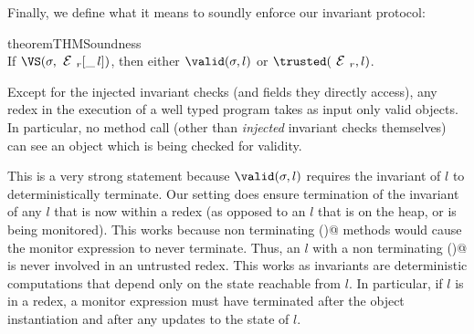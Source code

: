 Finally, we define what it means to soundly enforce our invariant protocol:

\SS\begin{restatable}[Soundness]{theorem}{THMSoundness}\ \\ %
\indent If $\VS(\s, \ER[\_\,l])$, then either $\valid(\s,l)$ or $\trusted(\ER,l)$.
\end{restatable}\SS\noindent
Except for the injected invariant checks (and fields they directly access),
any redex in the execution of a well typed program takes as input only valid objects.
In particular, no method call (other than \emph{injected} invariant checks themselves) can see an object which is being checked for validity.

This is a very strong statement because $\valid(\s,l)$ requires
the invariant of $l$ to deterministically terminate.
Our setting does ensure termination of the invariant of any $l$ that is now within a redex (as opposed to an $l$ that is on the heap, or is being monitored).
This works because non terminating \Q@invariant()@ methods would cause the monitor expression to never terminate. Thus, an
$l$ with a non terminating \Q@invariant()@ is never involved in an untrusted redex.
This works as invariants are deterministic computations that depend only on the state reachable from $l$.
In particular, if $l$ is in a redex, a monitor expression must have terminated after the object instantiation
and after any updates to the state of $l$.


\lstset{language=FortyThree} %
